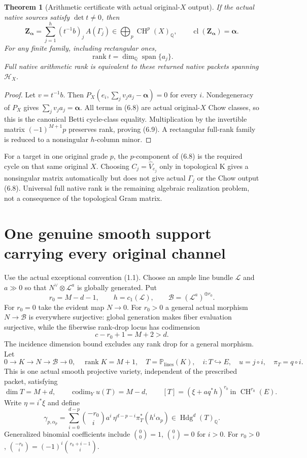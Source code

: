 \documentclass[11pt]{article}
\newcommand{\Q}{\mathbb Q}
\newcommand{\CH}{\operatorname{CH}}
\newcommand{\Hdg}{\operatorname{Hdg}}
\newcommand{\cl}{\operatorname{cl}}
\newtheorem{theorem}{Theorem}[section]
\begin{document}
\begin{theorem}[Arithmetic certificate with actual original-$X$ output]
If the actual native sources satisfy $\det t\ne0$, then
\[
 \boxed{\boldsymbol Z_{\boldsymbol\alpha}
        =\sum_{j=1}^{h}(t^{-1}b)_j\,A(\Gamma_j)
        \in\bigoplus_p\CH^p(X)_{\Q},\qquad
        \cl(\boldsymbol Z_{\boldsymbol\alpha})
              =\boldsymbol\alpha.}
 \tag{6.8}
\]
For any finite family, including rectangular ones,
\[
 \operatorname{rank}t
       =\dim_{\Q}\operatorname{span}\{a_j\}.
 \tag{6.9}
\]
Full native arithmetic rank is equivalent to these returned
native packets spanning $\mathcal H_X$.
\end{theorem}
\begin{proof}
Let $v=t^{-1}b$. Then
$P_X(e_i,\sum_jv_ja_j-\boldsymbol\alpha)=0$ for every $i$.
Nondegeneracy of $P_X$ gives $\sum_jv_ja_j=\boldsymbol\alpha$.
All terms in (6.8) are actual original-$X$ Chow classes, so this
is the canonical Betti cycle-class equality.
Multiplication by the invertible matrix $(-1)^{M+1}p$ preserves
rank, proving (6.9). A rectangular full-rank family is reduced
to a nonsingular $h$-column minor.
\end{proof}

For a target in one original grade $p$, the $p$-component of
(6.8) is the required cycle on that same original $X$.
Choosing $C_j=\widehat V_{e_j}$ only in topological K gives a
nonsingular matrix automatically but does not give actual
$\Gamma_j$ or the Chow output (6.8).
Universal full native rank is the remaining algebraic realization
problem, not a consequence of the topological Gram matrix.

\section{One genuine smooth support carrying every original channel}
Use the actual exceptional convention (1.1).
Choose an ample line bundle $\mathcal L$ and $a\gg0$ so that
$N^\vee\otimes\mathcal L^a$ is globally generated. Put
\[
 r_0=M-d-1,\qquad h=c_1(\mathcal L),\qquad
 \mathcal B=(\mathcal L^a)^{\oplus r_0}.
\]
For $r_0=0$ take the evident map $N\to0$.
For $r_0>0$ a general actual morphism $N\to\mathcal B$ is
everywhere surjective: global generation makes fiber evaluation
surjective, while the fiberwise rank-drop locus has codimension
\[
 c-r_0+1=M+2>d.
\]
The incidence dimension bound excludes any rank drop for a
general morphism. Let
\[
 0\to K\to N\to\mathcal B\to0,\quad
 \operatorname{rank}K=M+1,\quad
 T=\mathbb P_{\mathrm{lines}}(K),\quad
 i:T\hookrightarrow E,\quad u=j\circ i,\quad \pi_T=q\circ i.
 \tag{7.1}
\]
This is one actual smooth projective variety, independent of the
prescribed packet, satisfying
\[
 \dim T=M+d,\qquad
 \operatorname{codim}_Y u(T)=M-d,\qquad
 [T]=(\xi+a q^*h)^{r_0}\ \text{in }\CH^{r_0}(E).
 \tag{7.2}
\]
Write $\eta=i^*\xi$ and define
\[
 \gamma_{p,\alpha_p}
   =\sum_{i=0}^{d-p}{-r_0\choose i}a^i\,
       \eta^{d-p-i}\pi_T^*(h^i\alpha_p)
       \in\Hdg^d(T)_{\Q}.
 \tag{7.3}
\]
Generalized binomial coefficients include
$ {0\choose0}=1$, $ {0\choose i}=0$ for $i>0$.
For $r_0>0$, $ {-r_0\choose i}=(-1)^i{r_0+i-1\choose i}$.
\end{document}
